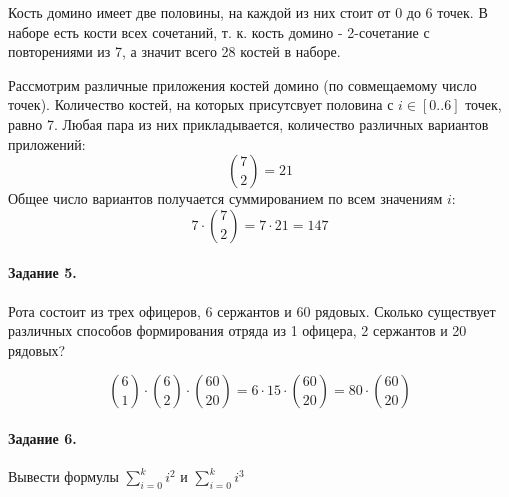 \documentclass[a4paper,12pt]{article}
\begin{document}
\begin{Solution}
Кость домино имеет две половины, на каждой из них стоит от 0 до 6 точек. В наборе есть кости всех сочетаний, т. к. кость домино - 2-сочетание с повторениями из 7, а значит всего 28 костей в наборе.

Рассмотрим различные приложения костей домино (по совмещаемому число точек). Количество костей, на которых присутсвует половина с $i \in \left[0 .. 6\right]$ точек, равно 7. Любая пара из них прикладывается, количество различных вариантов приложений: \[ \binom{7}{2} = 21 \] Общее число вариантов получается суммированием по всем значениям $i$: \[ 7 \cdot \binom{7}{2} = 7 \cdot 21 = 147 \]
\end{Solution}

\paragraph{Задание 5.} Рота состоит из трех офицеров, 6 сержантов и 60 рядовых. Сколько существует различных способов формирования отряда из 1 офицера, 2 сержантов и 20 рядовых?
\begin{Solution}
	\[ \binom{6}{1} \cdot \binom{6}{2} \cdot \binom{60}{20} = 6 \cdot 15 \cdot \binom{60}{20} = 80 \cdot \binom{60}{20} \]
\end{Solution}

\paragraph{Задание 6.} Вывести формулы $\sum_{i=0}^{k} i^2$ и $\sum_{i=0}^{k} i^3$
\end{document}
